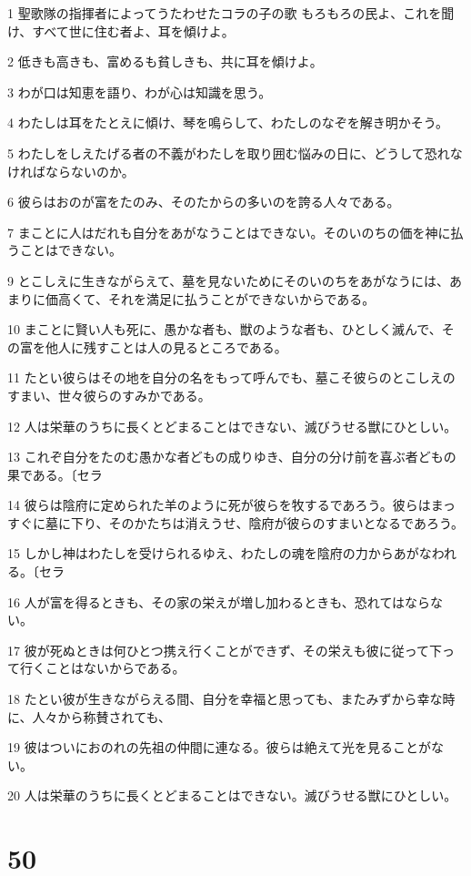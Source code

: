 \par 1 聖歌隊の指揮者によってうたわせたコラの子の歌 もろもろの民よ、これを聞け、すべて世に住む者よ、耳を傾けよ。
\par 2 低きも高きも、富めるも貧しきも、共に耳を傾けよ。
\par 3 わが口は知恵を語り、わが心は知識を思う。
\par 4 わたしは耳をたとえに傾け、琴を鳴らして、わたしのなぞを解き明かそう。
\par 5 わたしをしえたげる者の不義がわたしを取り囲む悩みの日に、どうして恐れなければならないのか。
\par 6 彼らはおのが富をたのみ、そのたからの多いのを誇る人々である。
\par 7 まことに人はだれも自分をあがなうことはできない。そのいのちの価を神に払うことはできない。
\par 9 とこしえに生きながらえて、墓を見ないためにそのいのちをあがなうには、あまりに価高くて、それを満足に払うことができないからである。
\par 10 まことに賢い人も死に、愚かな者も、獣のような者も、ひとしく滅んで、その富を他人に残すことは人の見るところである。
\par 11 たとい彼らはその地を自分の名をもって呼んでも、墓こそ彼らのとこしえのすまい、世々彼らのすみかである。
\par 12 人は栄華のうちに長くとどまることはできない、滅びうせる獣にひとしい。
\par 13 これぞ自分をたのむ愚かな者どもの成りゆき、自分の分け前を喜ぶ者どもの果である。〔セラ
\par 14 彼らは陰府に定められた羊のように死が彼らを牧するであろう。彼らはまっすぐに墓に下り、そのかたちは消えうせ、陰府が彼らのすまいとなるであろう。
\par 15 しかし神はわたしを受けられるゆえ、わたしの魂を陰府の力からあがなわれる。〔セラ
\par 16 人が富を得るときも、その家の栄えが増し加わるときも、恐れてはならない。
\par 17 彼が死ぬときは何ひとつ携え行くことができず、その栄えも彼に従って下って行くことはないからである。
\par 18 たとい彼が生きながらえる間、自分を幸福と思っても、またみずから幸な時に、人々から称賛されても、
\par 19 彼はついにおのれの先祖の仲間に連なる。彼らは絶えて光を見ることがない。
\par 20 人は栄華のうちに長くとどまることはできない。滅びうせる獣にひとしい。

\chapter{50}

